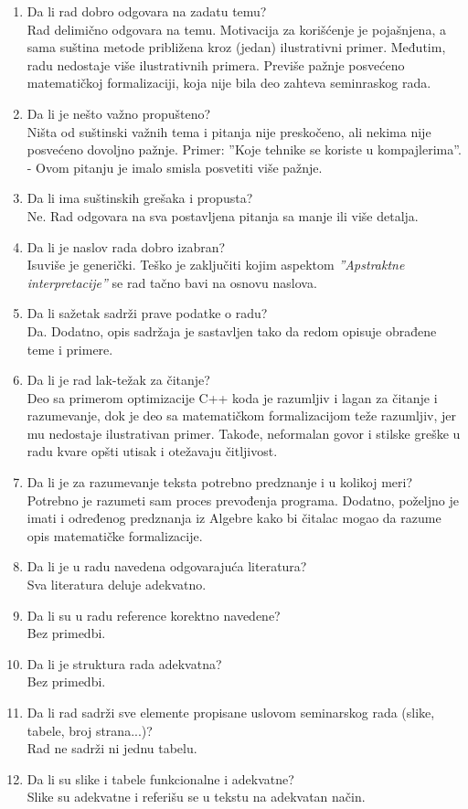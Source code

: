 \documentclass[a4paper]{report}
\begin{document}
\begin{enumerate}
\item Da li rad dobro odgovara na zadatu temu?\\
Rad delimično odgovara na temu. Motivacija za korišćenje je pojašnjena, a sama suština metode približena kroz (jedan) ilustrativni primer. 
Međutim, radu nedostaje više ilustrativnih primera. Previše pažnje posvećeno matematičkoj formalizaciji, koja nije bila deo zahteva seminraskog rada.
\item Da li je nešto važno propušteno?\\
Ništa od suštinski važnih tema i pitanja nije preskočeno, ali nekima nije posvećeno dovoljno pažnje. Primer: ''Koje tehnike se koriste u kompajlerima''. - Ovom pitanju je imalo smisla posvetiti više pažnje.
\item Da li ima suštinskih grešaka i propusta?\\
Ne. Rad odgovara na sva postavljena pitanja sa manje ili više detalja. 
\item Da li je naslov rada dobro izabran?\\
Isuviše je generički. Teško je zaključiti kojim aspektom \emph{''Apstraktne interpretacije''} se rad tačno bavi na osnovu naslova.
\item Da li sažetak sadrži prave podatke o radu?\\
Da. Dodatno, opis sadržaja je sastavljen tako da redom opisuje obrađene teme i primere.
\item Da li je rad lak-težak za čitanje?\\
Deo sa primerom optimizacije C++ koda je razumljiv i lagan za čitanje i razumevanje, dok je deo sa matematičkom formalizacijom teže razumljiv, jer mu nedostaje ilustrativan primer. Takođe, neformalan govor i stilske greške u radu kvare opšti utisak i otežavaju čitljivost.
\item Da li je za razumevanje teksta potrebno predznanje i u kolikoj meri?\\
Potrebno je razumeti sam proces prevođenja programa. Dodatno, poželjno je imati i određenog predznanja iz Algebre kako bi čitalac mogao da razume opis matematičke formalizacije.
\item Da li je u radu navedena odgovarajuća literatura?\\
Sva literatura deluje adekvatno.
\item Da li su u radu reference korektno navedene?\\
Bez primedbi.
\item Da li je struktura rada adekvatna?\\
Bez primedbi.
\item Da li rad sadrži sve elemente propisane uslovom seminarskog rada (slike, tabele, broj strana...)?\\
Rad ne sadrži ni jednu tabelu.
\item Da li su slike i tabele funkcionalne i adekvatne?\\
Slike su adekvatne i referišu se u tekstu na adekvatan način. 
\end{enumerate}
\end{document}
